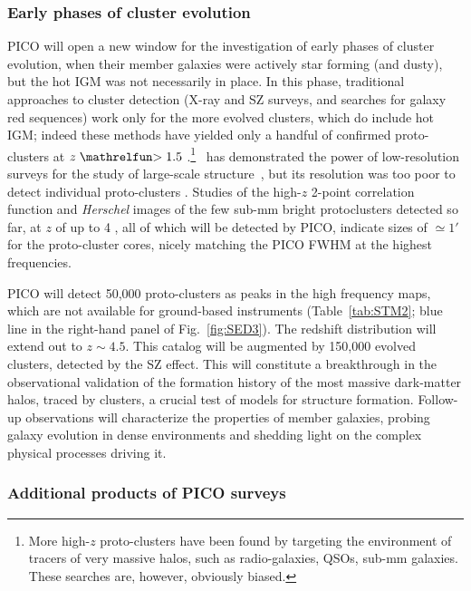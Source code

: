 \documentclass[PICOReport.tex]{subfiles}
\begin{document}
\subsubsection{Early phases of cluster evolution}

PICO will open a new window for the investigation of early phases of cluster evolution, when their member galaxies were actively star forming (and dusty), but the hot \ac{IGM} was not necessarily in place. In this phase, traditional approaches to cluster detection (X-ray and SZ surveys, and searches for galaxy red sequences) work only for the more evolved clusters, which do include hot \ac{IGM}; indeed these methods have yielded only a handful of confirmed proto-clusters at $z\simgt 1.5$ \cite{Overzier2016}.\footnote{More high-$z$ proto-clusters have been found by targeting the environment of tracers of very massive halos, such as radio-galaxies, QSOs, sub-mm galaxies. These searches are, however, obviously biased.} \planck~has demonstrated the power of low-resolution surveys for the study of large-scale structure~\cite{Planck2016high_z}, but its resolution was too poor to detect individual proto-clusters \cite{Negrello2017protocl}.  Studies of the high-$z$ 2-point correlation function \cite{Chen2016, Negrello2017protocl} and \textit{Herschel} images of the few sub-mm bright protoclusters detected so far, at $z$ of up to 4 \cite{Ivison2013, Wang2016, Oteo2018}, all of which will be detected by PICO, indicate sizes of $\simeq 1'$ for the proto-cluster cores, nicely matching the PICO FWHM at the highest frequencies.

PICO will detect 50,000 proto-clusters as peaks in the high frequency maps, which are not available for ground-based instruments (Table~\ref{tab:STM2}; blue line in the right-hand panel of Fig.~\ref{fig:SED3}).
The redshift distribution will extend out to $z\sim4.5$. This catalog will be augmented by 150,000 evolved clusters, detected by the SZ effect. This will constitute a breakthrough in the observational validation of the formation history of the most massive dark-matter halos, traced by clusters, a crucial test of models for structure formation. Follow-up observations will characterize the properties of member galaxies, probing galaxy evolution in dense environments and shedding light on the complex physical processes driving it.

\subsubsection{Additional products of PICO surveys}
\end{document}
